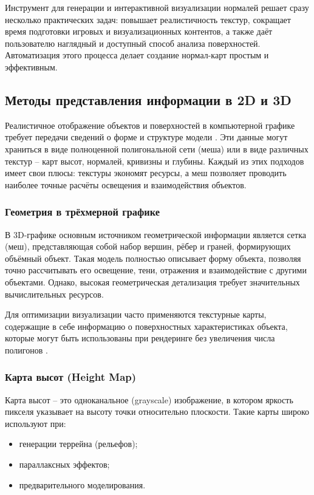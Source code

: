 Инструмент для генерации и интерактивной визуализации нормалей решает сразу несколько практических задач: повышает реалистичность текстур, сокращает время подготовки игровых и визуализационных контентов, а также даёт пользователю наглядный и доступный способ анализа поверхностей. Автоматизация этого процесса делает создание нормал-карт простым и эффективным.
\subsection{Методы представления информации в 2D и 3D}

Реалистичное отображение объектов и поверхностей в компьютерной графике требует передачи сведений о форме и структуре модели \cite{reed2020}. Эти данные могут храниться в виде полноценной полигональной сети (меша) или в виде различных текстур -- карт высот, нормалей, кривизны и глубины. Каждый из этих подходов имеет свои плюсы: текстуры экономят ресурсы, а меш позволяет проводить наиболее точные расчёты освещения и взаимодействия объектов.
\subsubsection{Геометрия в трёхмерной графике}

В 3D-графике основным источником геометрической информации является сетка (меш), представляющая собой набор вершин, рёбер и граней, формирующих объёмный объект. Такая модель полностью описывает форму объекта, позволяя точно рассчитывать его освещение, тени, отражения и взаимодействие с другими объектами. Однако, высокая геометрическая детализация требует значительных вычислительных ресурсов.

Для оптимизации визуализации часто применяются текстурные карты, содержащие в себе информацию о поверхностных характеристиках объекта, которые могут быть использованы при рендеринге без увеличения числа полигонов \cite{thalmann2021}.

\subsubsection{Карта высот (Height Map)}

Карта высот -- это одноканальное (grayscale) изображение, в котором яркость пикселя указывает на высоту точки относительно плоскости. Такие карты широко используют при:
\begin{itemize}
	\item генерации террейна (рельефов);
	\item параллаксных эффектов;
	\item предварительного моделирования.
\end{itemize}

